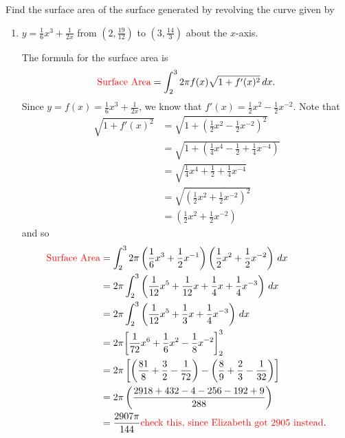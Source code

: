 \documentclass[]{ximera}
\begin{document}
\begin{problem}
Find the surface area of the surface generated by revolving the curve given by
	\begin{enumerate}
		\item  $y = \frac{1}{6} x^3 + \frac{1}{2x}$ from $\left( 2, \frac{19}{12} \right)$ to $\left( 3, \frac{14}{3} \right)$ about the $x$-axis.
		\begin{freeResponse}
		The formula for the surface area is
			\[
			\text{{\color{red} Surface Area}} = \int_2^3 2 \pi f(x) \sqrt{1+f'(x)^2} \,d x.
			\]
		Since $y = f(x) = \frac{1}{6} x^3 + \frac{1}{2x}$, we know that $f'(x) = \frac{1}{2} x^2 - \frac{1}{2} x^{-2}$.  
		Note that
			\begin{align*}
			\sqrt{1+f'(x)^2} &= \sqrt{1+ \left( \frac{1}{2}x^2 - \frac{1}{2}x^{-2} \right)^2}  \\
			&= \sqrt{1+ \left( \frac{1}{4}x^4 - \frac{1}{2} + \frac{1}{4}x^{-4} \right)}  \\
			&= \sqrt{\frac{1}{4}x^4 + \frac{1}{2} + \frac{1}{4}x^{-4}}  \\
			&= \sqrt{\left( \frac{1}{2}x^2 + \frac{1}{2}x^{-2} \right)^2}  \\
			&= \left( \frac{1}{2}x^2 + \frac{1}{2}x^{-2} \right)
			\end{align*}
		and so
			\begin{align*}
			\text{{\color{red} Surface Area}} &= \int_2^3 2 \pi \left( \frac{1}{6} x^3 + \frac{1}{2} x^{-1} \right) \left( \frac{1}{2} x^2 + \frac{1}{2} x^{-2} \right) \,d x  \\
			&= 2 \pi \int_2^3 \left( \frac{1}{12} x^5 + \frac{1}{12} x + \frac{1}{4} x + \frac{1}{4} x^{-3} \right) \,d x  \\
			&= 2 \pi \int_2^3 \left( \frac{1}{12} x^5 + \frac{1}{3} x + \frac{1}{4} x^{-3} \right) \,d x  \\
			&= 2 \pi \bigg[ \frac{1}{72}x^6 + \frac{1}{6}x^2 - \frac{1}{8}x^{-2} \bigg]_2^3  \\
			&= 2\pi \left[ \left( \frac{81}{8} + \frac{3}{2} - \frac{1}{72} \right) - \left( \frac{8}{9} + \frac{2}{3} - \frac{1}{32} \right) \right]  \\
			&= 2\pi \left( \frac{2918 + 432 - 4 - 256 - 192 + 9}{288} \right)  \\
			&= \frac{2907 \pi}{144} \text{{\color{red} check this, since Elizabeth got 2905 instead}}.
			\end{align*}
		\end{freeResponse}
		
		
		

\end{enumerate}
\end{problem}
\end{document}
